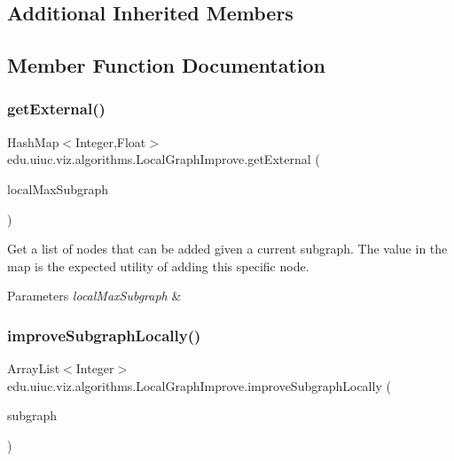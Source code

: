 \subsection*{Additional Inherited Members}


\subsection{Member Function Documentation}
\mbox{\label{classedu_1_1uiuc_1_1viz_1_1algorithms_1_1_local_graph_improve_aa0e9ee440e5ec2aa978a73207be84230}} 
\subsubsection{\texorpdfstring{getExternal()}{getExternal()}}
{\footnotesize\ttfamily Hash\+Map$<$Integer,Float$>$ edu.\+uiuc.\+viz.\+algorithms.\+Local\+Graph\+Improve.\+get\+External (\begin{DoxyParamCaption}\item[{Array\+List$<$ Integer $>$}]{local\+Max\+Subgraph }\end{DoxyParamCaption})}

Get a list of nodes that can be added given a current subgraph. The value in the map is the expected utility of adding this specific node.


\begin{DoxyParams}{Parameters}
{\em local\+Max\+Subgraph} & \\
\hline
\end{DoxyParams}
\mbox{\label{classedu_1_1uiuc_1_1viz_1_1algorithms_1_1_local_graph_improve_a0c4ae555848219fd07f2aab350d309bf}} 
\subsubsection{\texorpdfstring{improveSubgraphLocally()}{improveSubgraphLocally()}}
{\footnotesize\ttfamily Array\+List$<$Integer$>$ edu.\+uiuc.\+viz.\+algorithms.\+Local\+Graph\+Improve.\+improve\+Subgraph\+Locally (\begin{DoxyParamCaption}\item[{Array\+List$<$ Integer $>$}]{subgraph }\end{DoxyParamCaption})}

